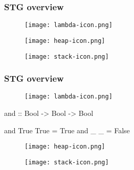 \documentclass[bigger,aspectratio=169]{beamer}
\begin{document}
\begin{frame}[fragile]
\frametitle{STG overview}
\begin{center}

	\begin{minipage}{0.30\textwidth}
		\begin{figure}
			\texttt{[image: lambda-icon.png]}
		\end{figure}
	\end{minipage}
	\hfill
	\pause
	\begin{minipage}{0.30\textwidth}
		\begin{figure}
			\texttt{[image: heap-icon.png]}
		\end{figure}
	\end{minipage}
	\hfill
	\pause
	\begin{minipage}{0.30\textwidth}
		\begin{figure}
			\texttt{[image: stack-icon.png]}
		\end{figure}
	\end{minipage}

\end{center}
\end{frame}

\begin{frame}[fragile]
\frametitle{STG overview}
\begin{center}

	\begin{minipage}{0.30\textwidth}
		\vspace{1cm}
		\begin{figure}
			\texttt{[image: lambda-icon.png]}
		\end{figure}
		\begin{haskellcode}
			and :: Bool -> Bool -> Bool
		\end{haskellcode}
		\vspace{-0.4cm}
		\begin{haskellcode}
			and True True = True
			and _    _    = False
		\end{haskellcode}
	\end{minipage}
	\hfill
	\begin{minipage}{0.30\textwidth}
		\begin{figure}
			\texttt{[image: heap-icon.png]}
		\end{figure}
	\end{minipage}
	\hfill
	\begin{minipage}{0.30\textwidth}
		\begin{figure}
			\texttt{[image: stack-icon.png]}
		\end{figure}
	\end{minipage}

\end{center}
\end{frame}
\end{document}
